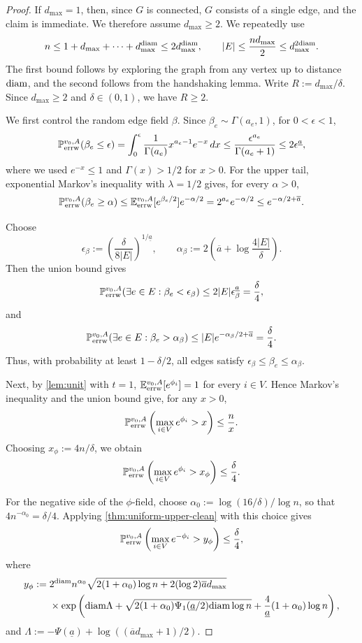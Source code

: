 \documentclass[a4paper, 11pt]{article}
\renewcommand{\P}{\mathbb{P}}
\newcommand{\E}{\mathbb{E}}
\newcommand{\Eerrw}{\E_{\textnormal{errw}}}
\newcommand{\Perrw}{\P_{\textnormal{errw}}}
\newcommand{\diam}{\textnormal{diam}}
\begin{document}
\begin{proof}
If $d_{\max}=1$, then, since $G$ is connected, $G$ consists of a single edge, and the claim is immediate. We therefore assume $d_{\max}\ge2$. We repeatedly use
\[
n\le 1+d_{\max}+\cdots+d_{\max}^{\diam}\le 2d_{\max}^{\diam},
\qquad
|E|\le \frac{nd_{\max}}{2}\le d_{\max}^{2\diam}.
\]
The first bound follows by exploring the graph from any vertex up to distance $\diam$, and the second follows from the handshaking lemma. Write $R:=d_{\max}/\delta$. Since $d_{\max}\ge2$ and $\delta\in(0,1)$, we have $R\ge2$.

We first control the random edge field $\beta$. Since $\beta_e\sim\Gamma(a_e,1)$, for $0<\epsilon<1$,
\[
\Perrw^{v_0,A}(\beta_e\le \epsilon)
=
\int_0^\epsilon \frac{1}{\Gamma(a_e)}x^{a_e-1}e^{-x}\,dx
\le
\frac{\epsilon^{a_e}}{\Gamma(a_e+1)}
\le
2\epsilon^{\underline a},
\]
where we used $e^{-x}\le1$ and $\Gamma(x)>1/2$ for $x>0$. For the upper tail, exponential Markov's inequality with $\lambda=1/2$ gives, for every $\alpha>0$,
\[
\Perrw^{v_0,A}(\beta_e\ge\alpha)
\le
\Eerrw^{v_0,A}[e^{\beta_e/2}]e^{-\alpha/2}
=
2^{a_e}e^{-\alpha/2}
\le
e^{-\alpha/2+\overline a}.
\]

Choose
\[
\epsilon_\beta:=\left(\frac{\delta}{8|E|}\right)^{1/\underline a},
\qquad
\alpha_\beta:=2\left(\overline a+\log\frac{4|E|}{\delta}\right).
\]
Then the union bound gives
\[
\Perrw^{v_0,A}(\exists e\in E:\beta_e<\epsilon_\beta)
\le
2|E|\epsilon_\beta^{\underline a}
=
\frac{\delta}{4},
\]
and
\[
\Perrw^{v_0,A}(\exists e\in E:\beta_e>\alpha_\beta)
\le
|E|e^{-\alpha_\beta/2+\overline a}
=
\frac{\delta}{4}.
\]
Thus, with probability at least $1-\delta/2$, all edges satisfy $\epsilon_\beta\le\beta_e\le\alpha_\beta$.

Next, by \cref{lem:unit} with $t=1$, $\Eerrw^{v_0, A}[e^{\phi_i}]=1$ for every $i\in V$. Hence Markov's inequality and the union bound give, for any $x>0$,
\[
\Perrw^{v_0,A}\left(\max_{i\in V}e^{\phi_i}>x\right)
\le
\frac{n}{x}.
\]
Choosing $x_\phi:=4n/\delta$, we obtain
\[
\Perrw^{v_0,A}\left(\max_{i\in V}e^{\phi_i}>x_\phi\right)
\le
\frac{\delta}{4}.
\]

For the negative side of the $\phi$-field, choose $\alpha_0:=\log(16/\delta)/\log n$, so that $4n^{-\alpha_0}=\delta/4$. Applying \cref{thm:uniform-upper-clean} with this choice gives
\[
\Perrw^{v_0,A}\left(\max_{i\in V}e^{-\phi_i}>y_\phi\right)
\le
\frac{\delta}{4},
\]
where
\[
\begin{aligned}
y_\phi
:={}&
2^{\diam}n^{\alpha_0}
\sqrt{2(1+\alpha_0)\log n+2(\log2)\overline a d_{\max}} \\
&\times
\exp\left(
\diam\Lambda
+
\sqrt{2(1+\alpha_0)\Psi_1(\underline a/2)\diam\log n}
+
\frac{4}{\underline a}(1+\alpha_0)\log n
\right),
\end{aligned}
\]
and $\Lambda:=-\Psi(\underline a)+\log((\overline a d_{\max}+1)/2)$.


\end{proof}
\end{document}
